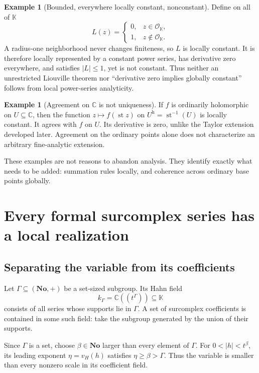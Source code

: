 \documentclass[11pt,a4paper]{article}
\theoremstyle{definition}\newtheorem{definition}[theorem]{Definition}
\newtheorem{example}[theorem]{Example}
\theoremstyle{remark}\newtheorem{remark}[theorem]{Remark}
\newcommand{\No}{\mathbf{No}}
\newcommand{\K}{\mathbb K}
\newcommand{\C}{\mathbb C}\newcommand{\R}{\mathbb R}\newcommand{\N}{\mathbb N}\newcommand{\Z}{\mathbb Z}
\newcommand{\fin}{\mathcal O_{\K}}\newcommand{\infinit}{\mathfrak m_{\K}}
\newcommand{\st}{\operatorname{st}}\newcommand{\supp}{\operatorname{supp}}
\newcommand{\vH}{v_H}
\newcommand{\halo}[1]{#1^{\mathrm h}}
\newcommand{\smallfield}{k_\Gamma}
\numberwithin{equation}{section}
\begin{document}
\begin{example}[Bounded, everywhere locally constant, nonconstant]\label{ex:badliouville}
Define on all of $\K$
\[
 L(z)=\begin{cases}0,&z\in\fin,\\1,&z\notin\fin.\end{cases}
\]
A radius-one neighborhood never changes finiteness, so $L$ is locally constant. It is therefore locally represented by a constant power series, has derivative zero everywhere, and satisfies $|L|\leq1$, yet is not constant. Thus neither an unrestricted Liouville theorem nor ``derivative zero implies globally constant'' follows from local power-series analyticity.
\end{example}

\begin{example}[Agreement on $\C$ is not uniqueness]
If $f$ is ordinarily holomorphic on $U\subseteq\C$, then the function
$z\mapsto f(\st z)$ on $\halo U=\st^{-1}(U)$ is locally constant. It agrees with $f$ on $U$. Its derivative is zero, unlike the Taylor extension developed later. Agreement on the ordinary points alone does not characterize an arbitrary fine-analytic extension.
\end{example}
These examples are not reasons to abandon analysis. They identify exactly what needs to be added: summation rules locally, and coherence across ordinary base points globally.

\section{Every formal surcomplex series has a local realization}\label{sec:realization}

\subsection{Separating the variable from its coefficients}
Let $\Gamma\subseteq(\No,+)$ be a set-sized subgroup. Its Hahn field
\[
 \smallfield=\C((t^\Gamma))\subseteq\K
\]
consists of all series whose supports lie in $\Gamma$. A set of surcomplex coefficients is contained in some such field: take the subgroup generated by the union of their supports.

Since $\Gamma$ is a set, choose $\beta\in\No$ larger than every element of $\Gamma$. For $0<|h|<t^\beta$, its leading exponent $\eta=\vH(h)$ satisfies $\eta\geq\beta>\Gamma$. Thus the variable is smaller than every nonzero scale in its coefficient field.
\end{document}
